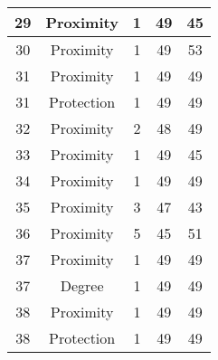 \documentclass[results.tex]{subfiles}
\begin{document}
\begin{center}
\begin{tabular}{| c || c | c | c | c |}
            \hline
            29                      & Proximity                    & 1                      & 49                      & 45                   \\
            \hline
            30                      & Proximity                    & 1                      & 49                      & 53                   \\
            \hline
            31                      & Proximity                    & 1                      & 49                      & 49                   \\
            \hline
            31                      & Protection                   & 1                      & 49                      & 49                   \\
            \hline
            32                      & Proximity                    & 2                      & 48                      & 49                   \\
            \hline
            33                      & Proximity                    & 1                      & 49                      & 45                   \\
            \hline
            34                      & Proximity                    & 1                      & 49                      & 49                   \\
            \hline
            35                      & Proximity                    & 3                      & 47                      & 43                   \\
            \hline
            36                      & Proximity                    & 5                      & 45                      & 51                   \\
            \hline
            37                      & Proximity                    & 1                      & 49                      & 49                   \\
            \hline
            37                      & Degree                       & 1                      & 49                      & 49                   \\
            \hline
            38                      & Proximity                    & 1                      & 49                      & 49                   \\
            \hline
            38                      & Protection                   & 1                      & 49                      & 49                   \\

\end{tabular}
\end{center}
\end{document}

